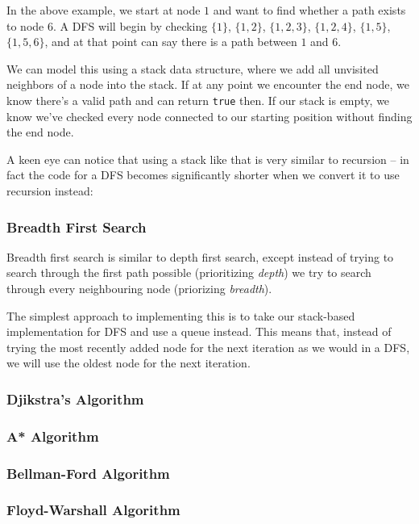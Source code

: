 In the above example, we start at node $1$ and want to find whether a path exists to node $6$. A DFS will begin by checking $\{1\}$, $\{1, 2\}$, $\{1, 2, 3\}$, $\{1, 2, 4\}$, $\{1, 5\}$, $\{1, 5, 6\}$, and at that point can say there is a path between $1$ and $6$. 

We can model this using a stack data structure, where we add all unvisited neighbors of a node into the stack. If at any point we encounter the end node, we know there's a valid path and can return \texttt{true} then. If our stack is empty, we know we've checked every node connected to our starting position without finding the end node.


A keen eye can notice that using a stack like that is very similar to recursion -- in fact the code for a DFS becomes significantly shorter when we convert it to use recursion instead:


\subsubsection{Breadth First Search}

Breadth first search is similar to depth first search, except instead of trying to search through the first path possible (prioritizing \textit{depth}) we try to search through every neighbouring node (priorizing \textit{breadth}).

The simplest approach to implementing this is to take our stack-based implementation for DFS and use a queue instead. This means that, instead of trying the most recently added node for the next iteration as we would in a DFS, we will use the oldest node for the next iteration.

\subsubsection{Djikstra's Algorithm}
\subsubsection{A* Algorithm}
\subsubsection{Bellman-Ford Algorithm}
\subsubsection{Floyd-Warshall Algorithm}
